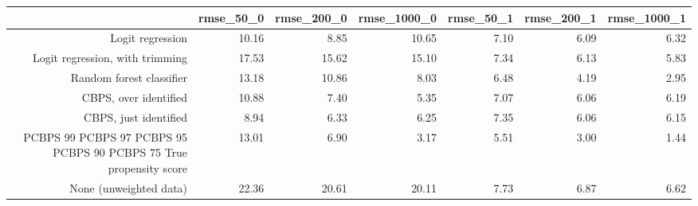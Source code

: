\begin{center}
\begin{tabular}{rrrrrrr}
\hline  & rmse_50_0 & rmse_200_0 & rmse_1000_0 & rmse_50_1 & rmse_200_1 & rmse_1000_1\\
\hline Logit regression & 10.16 & 8.85 & 10.65 & 7.10 & 6.09 & 6.32\\
Logit regression, with trimming & 17.53 & 15.62 & 15.10 & 7.34 & 6.13 & 5.83\\
Random forest classifier & 13.18 & 10.86 & 8.03 & 6.48 & 4.19 & 2.95\\
CBPS, over identified & 10.88 & 7.40 & 5.35 & 7.07 & 6.06 & 6.19\\
CBPS, just identified & 8.94 & 6.33 & 6.25 & 7.35 & 6.06 & 6.15\\
PCBPS 99%
PCBPS 97%
PCBPS 95%
PCBPS 90%
PCBPS 75%
True propensity score & 13.01 & 6.90 & 3.17 & 5.51 & 3.00 & 1.44\\
None (unweighted data) & 22.36 & 20.61 & 20.11 & 7.73 & 6.87 & 6.62\\
\hline\end{tabular}\\
\end{center}

